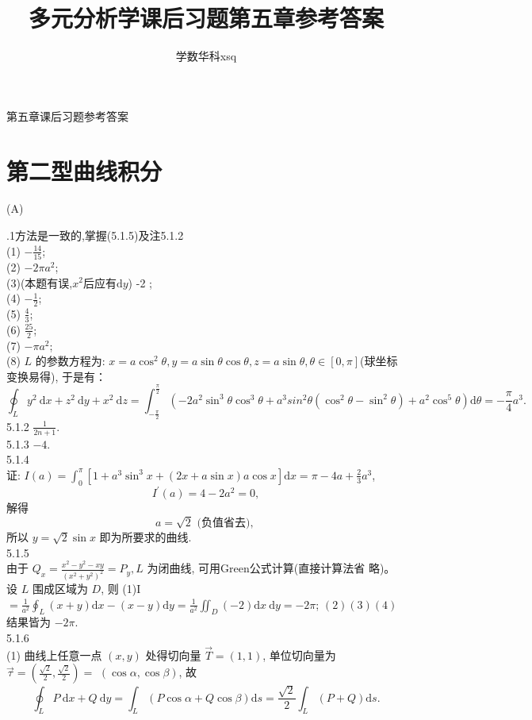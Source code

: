 \documentclass[a4paper,11pt,UTF8]{article}
\title{多元分析学课后习题第五章参考答案}
\author{学数华科xsq}
\begin{document}
	第五章课后习题参考答案
\section{第二型曲线积分}
\centerline{(A)}  
.1\quad 方法是一致的,掌握(5.1.5)及注5.1.2\\
(1) $-\frac{14}{15}$;\\
(2) $-2 \pi a^2$;\\
(3)(本题有误,$x^2$后应有$\mathrm{d}y$) -2 ;\\
(4) $-\frac{1}{2}$;\\
(5) $\frac{4}{3}$;\\
(6) $\frac{25}{2}$;\\
(7) $-\pi a^2$;\\
(8) $L$ 的参数方程为: $x=a\cos^2\theta, y=a\sin\theta\cos\theta, z=a \sin\theta, \theta \in[0, \pi]$(球坐标变换易得), 于是有：
$$
\oint_L y^2 \mathrm{~d} x+z^2 \mathrm{~d} y+x^2 \mathrm{~d} z=\int_{-\frac{\pi}{2}}^{ \frac{\pi}{2}}\left(-2a^2\sin^3\theta\cos^3\theta+a^3sin^2\theta\left(\cos^2\theta - \sin ^2 \theta\right)+a^2\cos^5\theta\right) \mathrm{d} \theta=-\frac{\pi}{4} a^3 .
$$
5.1.2 $\frac{1}{2 n+1}$.\\
5.1.3 $-4$.\\
5.1.4\\
证: $I(a)=\int_0^\pi\left[1+a^3 \sin ^3 x+(2 x+a \sin x) a \cos x\right] \mathrm{d} x=\pi-4 a+\frac{2}{3} a^3$,
$$
I^{\prime}(a)=4-2 a^2=0,
$$
解得
$$
a=\sqrt{2} \text { (负值省去), }
$$
所以 $y=\sqrt{2} \sin x$ 即为所要求的曲线.\\	
5.1.5\\
由于 $Q_x=\frac{x^2-y^2-x y}{\left(x^2+y^2\right)^2}=P_y, L$ 为闭曲线, 可用Green公式计算(直接计算法省 略)。\\
设 $L$ 围成区域为 $D$, 则
(1)I $=\frac{1}{a^2} \oint_L(x+y) \mathrm{d} x-(x-y) \mathrm{d} y=\frac{1}{a^2} \iint_D(-2) \mathrm{d} x \mathrm{~d} y=-2 \pi$;
$(2)(3)(4)$ 结果皆为 $-2 \pi$.\\
5.1.6\\
(1) 曲线上任意一点 $(x, y)$ 处得切向量 $\vec{T}=(1,1)$, 单位切向量为 $\vec{\tau}=\left(\frac{\sqrt{2}}{2}, \frac{\sqrt{2}}{2}\right)=$ $(\cos \alpha, \cos \beta)$, 故
$$
\oint_L P \mathrm{~d} x+Q \mathrm{~d} y=\int_L(P \cos \alpha+Q \cos \beta) \mathrm{d} s=\frac{\sqrt{2}}{2} \int_L(P+Q) \mathrm{d} s .
$$
\end{document}

